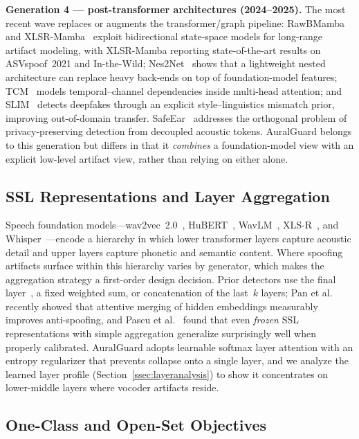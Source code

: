 \textbf{Generation 4 --- post-transformer architectures (2024--2025).} The most recent
wave replaces or augments the transformer/graph pipeline: RawBMamba~\cite{chen2024rawbmamba}
and XLSR-Mamba~\cite{xiao2025xlsrmamba} exploit bidirectional state-space models for
long-range artifact modeling, with XLSR-Mamba reporting state-of-the-art results on
ASVspoof~2021 and In-the-Wild; Nes2Net~\cite{liu2025nes2net} shows that a lightweight
nested architecture can replace heavy back-ends on top of foundation-model features;
TCM~\cite{truong2024tcm} models temporal--channel dependencies inside multi-head
attention; and SLIM~\cite{zhu2024slim} detects deepfakes through an explicit
style--linguistics mismatch prior, improving out-of-domain transfer. SafeEar~\cite{li2024safeear}
addresses the orthogonal problem of privacy-preserving detection from decoupled
acoustic tokens. AuralGuard belongs to this generation but differs in that it
\emph{combines} a foundation-model view with an explicit low-level artifact view,
rather than relying on either alone.

\subsection{SSL Representations and Layer Aggregation}
\label{ssec:related-ssl}

Speech foundation models---wav2vec~2.0~\cite{baevski2020wav2vec},
HuBERT~\cite{hsu2021hubert}, WavLM~\cite{chen2022wavlm}, XLS-R~\cite{babu2022xlsr},
and Whisper~\cite{radford2023whisper}---encode a hierarchy in which lower transformer
layers capture acoustic detail and upper layers capture phonetic and semantic content.
Where spoofing artifacts surface within this hierarchy varies by generator, which
makes the aggregation strategy a first-order design decision. Prior detectors use the
final layer~\cite{tak2022automatic}, a fixed weighted sum, or concatenation of the
last~$k$ layers; Pan et al.~\cite{pan2024attentive} recently showed that attentive
merging of hidden embeddings measurably improves anti-spoofing, and Pascu et
al.~\cite{pascu2024calibrated} found that even \emph{frozen} SSL representations with
simple aggregation generalize surprisingly well when properly calibrated. AuralGuard
adopts learnable softmax layer attention with an entropy regularizer that prevents
collapse onto a single layer, and we analyze the learned layer profile
(Section~\ref{ssec:layeranalysis}) to show it concentrates on lower-middle layers
where vocoder artifacts reside.

\subsection{One-Class and Open-Set Objectives}
\label{ssec:related-oneclass}


